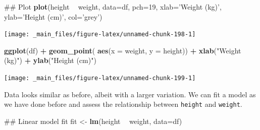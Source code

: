 \documentclass[]{book}
\newenvironment{Shaded}{\begin{snugshade}}{\end{snugshade}}
\newcommand{\KeywordTok}[1]{\textcolor[rgb]{0.13,0.29,0.53}{\textbf{#1}}}
\newcommand{\DataTypeTok}[1]{\textcolor[rgb]{0.13,0.29,0.53}{#1}}
\newcommand{\DecValTok}[1]{\textcolor[rgb]{0.00,0.00,0.81}{#1}}
\newcommand{\StringTok}[1]{\textcolor[rgb]{0.31,0.60,0.02}{#1}}
\newcommand{\OperatorTok}[1]{\textcolor[rgb]{0.81,0.36,0.00}{\textbf{#1}}}
\newcommand{\NormalTok}[1]{#1}
\newcommand{\bmp}{\begin{minipage}[c]{0.5\textwidth}}
\newcommand{\emp}{\end{minipage}}
\newcommand{\bblockST}[1]{\begin{tcolorbox}[title = #1, colframe=taskCol1, breakable, parbox = false]}
\newcommand{\eblockST}{\end{tcolorbox}}
\theoremstyle{definition}
\theoremstyle{definition}
\theoremstyle{definition}
\theoremstyle{remark}
\begin{document}
\newpage

\bmp
\bblockST{Base R}

\begin{Shaded}
\begin{Highlighting}[]
\NormalTok{## Plot}
\KeywordTok{plot}\NormalTok{(height }\OperatorTok{~}\StringTok{ }\NormalTok{weight, }\DataTypeTok{data=}\NormalTok{df, }
     \DataTypeTok{pch=}\DecValTok{19}\NormalTok{, }\DataTypeTok{xlab=}\StringTok{'Weight (kg)'}\NormalTok{, }
     \DataTypeTok{ylab=}\StringTok{'Height (cm)'}\NormalTok{, }\DataTypeTok{col=}\StringTok{'grey'}\NormalTok{)}
\end{Highlighting}
\end{Shaded}

\begin{center}\texttt{[image: \_main\_files/figure-latex/unnamed-chunk-198-1]} \end{center}

\eblockST
\emp
\hspace{0.01\textwidth} \bmp\bblockST{\texttt{tidyverse}}

\begin{Shaded}
\begin{Highlighting}[]
\KeywordTok{ggplot}\NormalTok{(df) }\OperatorTok{+}\StringTok{ }
\StringTok{    }\KeywordTok{geom_point}\NormalTok{(}
        \KeywordTok{aes}\NormalTok{(}\DataTypeTok{x =}\NormalTok{ weight, }\DataTypeTok{y =}\NormalTok{ height)) }\OperatorTok{+}
\StringTok{    }\KeywordTok{xlab}\NormalTok{(}\StringTok{"Weight (kg)"}\NormalTok{) }\OperatorTok{+}\StringTok{ }
\StringTok{    }\KeywordTok{ylab}\NormalTok{(}\StringTok{"Height (cm)"}\NormalTok{)}
\end{Highlighting}
\end{Shaded}

\begin{center}\texttt{[image: \_main\_files/figure-latex/unnamed-chunk-199-1]} \end{center}

\eblockST
\emp

\newpage

Data looks similar as before, albeit with a larger variation. We can fit
a model as we have done before and assess the relationship between
\texttt{height} and \texttt{weight}.

\begin{Shaded}
\begin{Highlighting}[]
\NormalTok{## Linear model fit}
\NormalTok{fit <-}\StringTok{ }\KeywordTok{lm}\NormalTok{(height }\OperatorTok{~}\StringTok{ }\NormalTok{weight, }\DataTypeTok{data=}\NormalTok{df)}
\end{Highlighting}
\end{Shaded}
\end{document}

